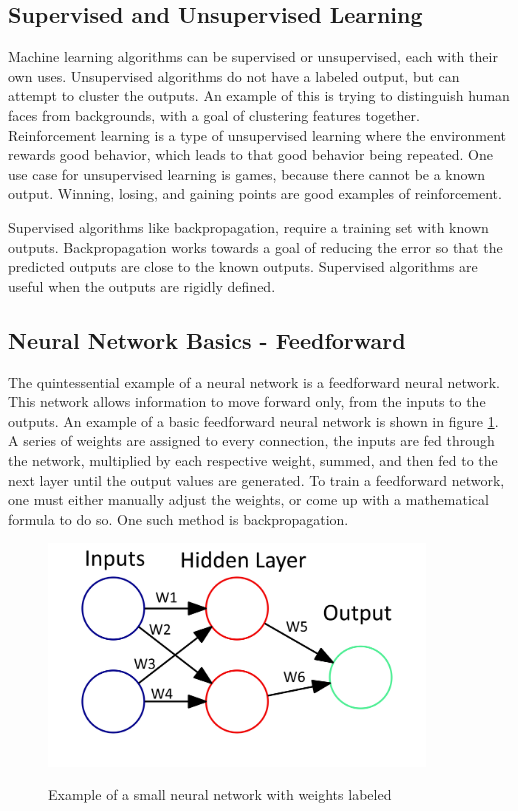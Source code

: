 \documentclass[12pt]{ucthesis}
\newcommand{\captionfonts}{\small\bf\ssp}
\begin{document}
\subsection{Supervised and Unsupervised Learning}
Machine learning algorithms can be supervised or unsupervised, each with their own uses. Unsupervised algorithms do not have a labeled output, but can attempt to cluster the outputs.  An example of this is trying to distinguish human faces from backgrounds, with a goal of clustering features together. Reinforcement learning is a type of unsupervised learning where the environment rewards good behavior, which leads to that good behavior being repeated. One use case for unsupervised learning is games, because there cannot be a known output. Winning, losing, and gaining points are good examples of reinforcement. 

Supervised algorithms like backpropagation, require a training set with known outputs. Backpropagation works towards a goal of reducing the error so that the predicted outputs are close to the known outputs. Supervised algorithms are useful when the outputs are rigidly defined\cite{SuperAndNotSuper}.

\subsection{Neural Network Basics - Feedforward}
\label{Neural Network Basics - Feedforward}
The quintessential example of a neural network is a feedforward neural network. This network allows information to move forward only, from the inputs to the outputs. An example of a basic feedforward neural network is shown in figure \ref{fig:smallNN}. A series of weights are assigned to every connection, the inputs are fed through the network, multiplied by each respective weight, summed, and then fed to the next layer until the output values are generated. To train a feedforward network, one must either manually adjust the weights, or come up with a mathematical formula to do so. One such method is backpropagation\cite{feedforwardsource}.

\begin{figure}[t]
\begin{center}
\includegraphics[width=10cm]{simpler.png}
\captionfonts
\caption[Small Neural Network Example]{Example of a small neural network with weights labeled}
\label{fig:smallNN}
\end{center}
\end{figure}
\end{document}
